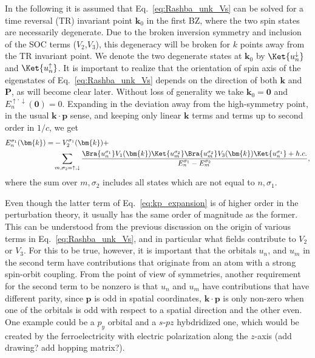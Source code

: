 In the following it is assumed that Eq.~\ref{eq:Rashba_unk_Vs} can be solved for a time reversal (TR) invariant point $\bm{k}_0$ in the first BZ, where the two spin states are necessarily degenerate. Due to the broken inversion symmetry and inclusion of the SOC terms ($V_2$,$V_3$), this degeneracy will be broken for $k$ points away from the TR invariant point.
We denote the two degenerate states at $\bm{k}_0$ by $\Ket{u_n^\downarrow}$ and $\Ket{u_n^\uparrow}$. It is important to realize that the orientation of spin axis of the eigenstates of Eq.~\ref{eq:Rashba_unk_Vs} depends on the direction of both $\bm{k}$ and $\bm{P}$, as will become clear later.
Without loss of generality we take $\bm{k}_0 = \bm{0}$ and $E^{\uparrow,\downarrow}_n(\bm{0}) = 0$.
Expanding in the deviation away from the high-symmetry point, in the usual $\bm{k}\cdot\bm{p}$ sense, and keeping only linear $\bm{k}$ terms and terms up to second order in $1/c$, we get
\begin{align}
	\label{eq:kp_expansion}
	E_n^{\sigma_1}(\bm{k}) =& - V_2^{\sigma_1}(\bm{k}) + \\
		& \sum_{m,\sigma_2=\uparrow,\downarrow}\frac{\Bra{u_n^{\sigma_1}} V_1(\bm{k}) \Ket{u_m^{\sigma_2}}\Bra{u_m^{\sigma_2}} V_3(\bm{k}) \Ket{u_n^{\sigma_1}} + h.c.}{E_n^{\sigma_1} - E_m^{\sigma_2}},
\end{align}
where the sum over $m, \sigma_2$ includes all states which are not equal to $n, \sigma_1$. 

Even though the latter term of Eq.~\ref{eq:kp_expansion} is of higher order in the perturbation theory, it usually has the same order of magnitude as the former. This can be understood from the previous discussion on the origin of various terms in Eq.~\ref{eq:Rashba_unk_Vs}, and in particular what fields contribute to $V_2$ or $V_3$. 
For this to be true, however, it is important that the orbitals $u_n$, and $u_m$ in the second term have contributions that originate from an atom with a strong spin-orbit coupling. From the point of view of symmetries, another requirement for the second term to be nonzero is that $u_n$ and $u_m$ have contributions that have different parity, since $\bm{p}$ is odd in spatial coordinates, $\bm{k} \cdot \bm{p}$ is only non-zero when one of the orbitals is odd with respect to a spatial direction and the other even. One example could be a $p_y$ orbital and a $s$-$pz$ hybdridized one, which would be created by the ferroelectricity with electric polarization along the $z$-axis (add drawing? add hopping matrix?).

